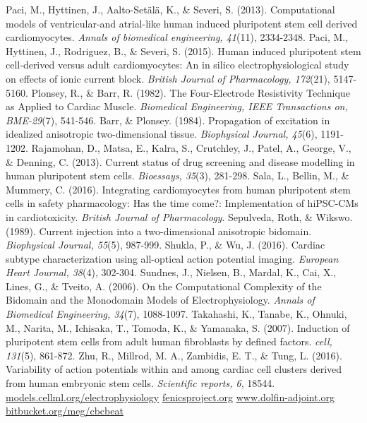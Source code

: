 \documentclass[12pt,a4paper]{article}
\begin{document}
\begin{thebibliography}{99}
 Paci, M., Hyttinen, J., Aalto-Set\"al\"a, K., \& Severi, S. (2013). Computational models of ventricular-and atrial-like human induced pluripotent stem cell derived cardiomyocytes. \textit{Annals of biomedical engineering, 41}(11), 2334-2348.
 Paci, M., Hyttinen, J., Rodriguez, B., \& Severi, S. (2015). Human induced pluripotent stem cell‐derived versus adult cardiomyocytes: An in silico electrophysiological study on effects of ionic current block. \textit{British Journal of Pharmacology, 172}(21), 5147-5160.
 Plonsey, R., \& Barr, R. (1982). The Four-Electrode Resistivity Technique as Applied to Cardiac Muscle. \textit{Biomedical Engineering, IEEE Transactions on, BME-29}(7), 541-546.
 Barr, \& Plonsey. (1984). Propagation of excitation in idealized anisotropic two-dimensional tissue. \textit{Biophysical Journal, 45}(6), 1191-1202.
 Rajamohan, D., Matsa, E., Kalra, S., Crutchley, J., Patel, A., George, V., \& Denning, C. (2013). Current status of drug screening and disease modelling in human pluripotent stem cells. \textit{Bioessays, 35}(3), 281-298.
 Sala, L., Bellin, M., \& Mummery, C. (2016). Integrating cardiomyocytes from human pluripotent stem cells in safety pharmacology: Has the time come?: Implementation of hiPSC-CMs in cardiotoxicity. \textit{British Journal of Pharmacology}.
 Sepulveda, Roth, \& Wikswo. (1989). Current injection into a two-dimensional anisotropic bidomain. \textit{Biophysical Journal, 55}(5), 987-999.
 Shukla, P., \& Wu, J. (2016). Cardiac subtype characterization using all-optical action potential imaging. \textit{European Heart Journal, 38}(4), 302-304.
 Sundnes, J., Nielsen, B., Mardal, K., Cai, X., Lines, G., \& Tveito, A. (2006). On the Computational Complexity of the Bidomain and the Monodomain Models of Electrophysiology. \textit{Annals of Biomedical Engineering, 34}(7), 1088-1097.
 Takahashi, K., Tanabe, K., Ohnuki, M., Narita, M., Ichisaka, T., Tomoda, K., \& Yamanaka, S. (2007). Induction of pluripotent stem cells from adult human fibroblasts by defined factors. \textit{cell, 131}(5), 861-872.
 Zhu, R., Millrod, M. A., Zambidis, E. T., \& Tung, L. (2016). Variability of action potentials within and among cardiac cell clusters derived from human embryonic stem cells. \textit{Scientific reports, 6}, 18544.
 \url{models.cellml.org/electrophysiology}
 \url{fenicsproject.org}
 \url{www.dolfin-adjoint.org}
 \url{bitbucket.org/meg/cbcbeat}
\end{thebibliography}
%
\end{document}
